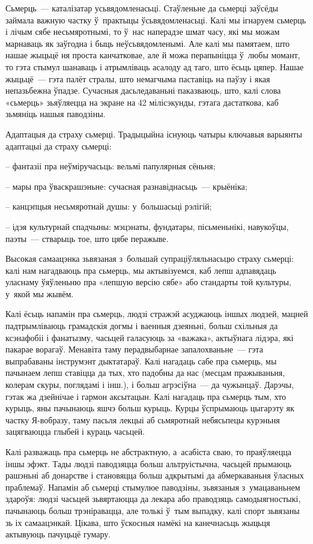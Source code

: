 Сьмерць~--- каталізатар усьвядомленасьці. Стаўленьне да сьмерці заўсёды займала важную частку ў~практыцы ўсьвядомленасьці. Калі мы ігнаруем сьмерць і лічым сябе несьмяротнымі, то ў~нас наперадзе шмат часу, які мы можам марнаваць як заўгодна і быць неўсьвядомленымі. Але калі мы памятаем, што нашае жыцьцё ня проста канчатковае, але й можа перапыніцца ў~любы момант, то гэта стымул шанаваць і атрымліваць асалоду ад таго, што ёсьць цяпер. Нашае жыцьцё~--- гэта палёт стралы, што немагчыма паставіць на паўзу і якая непазьбежна ўпадзе. Сучасныя дасьледаваньні паказваюць, што, калі слова «сьмерць» зьяўляецца на экране на 42 мілісэкунды, гэтага дастаткова, каб зьмяніць нашыя паводзіны. 

Адаптацыя да страху сьмерці. Традыцыйна існуюць чатыры ключавыя варыянты адаптацыі да страху сьмерці: 

– фантазіі пра неўміручасьць: вельмі папулярныя сёньня;

– мары пра ўваскрашэньне: сучасная разнавіднасьць~--- крыёніка;

– канцэпцыя несьмяротнай душы: у~большасьці рэлігій;

– ідэя культурнай спадчыны: мэцэнаты, фундатары, пісьменьнікі, навукоўцы, паэты~--- стварыць тое, што цябе перажыве.

Высокая самаацэнка зьвязаная з~большай супраціўляльнасьцю страху сьмерці: калі нам нагадваюць пра сьмерць, мы актывізуемся, каб лепш адпавядаць уласнаму ўяўленьню пра «лепшую версію сябе» або стандарты той культуры, у~якой мы жывём.

Калі ёсьць напамін пра сьмерць, людзі стражэй асуджаюць іншых людзей, мацней падтрымліваюць грамадскія догмы і ваенныя дзеяньні, больш схільныя да ксэнафобіі і фанатызму, часьцей галасуюць за «важака», актыўнага лідэра, які пакарае ворагаў. Менавіта таму перадвыбарнае запалохваньне~--- гэта выпрабаваны інструмэнт дыктатараў. Калі нагадаць сабе пра сьмерць, мы пачынаем лепш ставіцца да тых, хто падобны да нас (месцам пражываньня, колерам скуры, поглядамі і інш.), і больш агрэсіўна~--- да чужынцаў. Дарэчы, гэтак жа дзейнічае і гармон аксытацын. Калі нагадаць пра сьмерць тым, хто курыць, яны пачынаюць яшчэ больш курыць. Курцы ўспрымаюць цыгарэту як частку Я-вобразу, таму пасьля лекцыі аб сьмяротнай небясьпецы курэньня зацягваюцца глыбей і кураць часьцей.

Калі разважаць пра сьмерць не абстрактную, а~асабіста сваю, то праяўляецца іншы эфэкт. Тады людзі паводзяцца больш альтруістычна, часьцей прымаюць рашэньні аб донарстве і становяцца больш адкрытымі да абмеркаваньня ўласных праблемаў. Напамін аб сьмерці стымулюе паводзіны, зьвязаныя з~умацаваньнем здароўя: людзі часьцей зьвяртаюцца да лекара або праводзяць самодыягностыкі, пачынаюць больш трэніравацца, але толькі ў~тым выпадку, калі спорт зьвязаны зь іх самаацэнкай. Цікава, што ўскосныя намёкі на канечнасьць жыцьця актывуюць пачуцьцё гумару.

